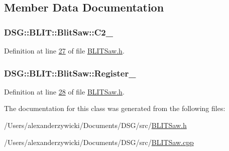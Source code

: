 \subsection{Member Data Documentation}
\hypertarget{class_d_s_g_1_1_b_l_i_t_1_1_blit_saw_a39ff301ab1f690c070b2045d4a2c40bf}{
\subsubsection[{C2\+\_\+}]{ D\+S\+G\+::\+B\+L\+I\+T\+::\+Blit\+Saw\+::\+C2\+\_\+\hspace{0.3cm}{\ttfamily [protected]}}}\label{class_d_s_g_1_1_b_l_i_t_1_1_blit_saw_a39ff301ab1f690c070b2045d4a2c40bf}


Definition at line \hyperlink{_b_l_i_t_saw_8h_source_l00027}{27} of file \hyperlink{_b_l_i_t_saw_8h_source}{B\+L\+I\+T\+Saw.\+h}.

\hypertarget{class_d_s_g_1_1_b_l_i_t_1_1_blit_saw_a15da9acffc369dd3c5233c05d37ee488}{
\subsubsection[{Register\+\_\+}]{ D\+S\+G\+::\+B\+L\+I\+T\+::\+Blit\+Saw\+::\+Register\+\_\+\hspace{0.3cm}{\ttfamily [protected]}}}\label{class_d_s_g_1_1_b_l_i_t_1_1_blit_saw_a15da9acffc369dd3c5233c05d37ee488}


Definition at line \hyperlink{_b_l_i_t_saw_8h_source_l00028}{28} of file \hyperlink{_b_l_i_t_saw_8h_source}{B\+L\+I\+T\+Saw.\+h}.



The documentation for this class was generated from the following files\+:\begin{DoxyCompactItemize}
\item 
/\+Users/alexanderzywicki/\+Documents/\+D\+S\+G/src/\hyperlink{_b_l_i_t_saw_8h}{B\+L\+I\+T\+Saw.\+h}\item 
/\+Users/alexanderzywicki/\+Documents/\+D\+S\+G/src/\hyperlink{_b_l_i_t_saw_8cpp}{B\+L\+I\+T\+Saw.\+cpp}\end{DoxyCompactItemize}
